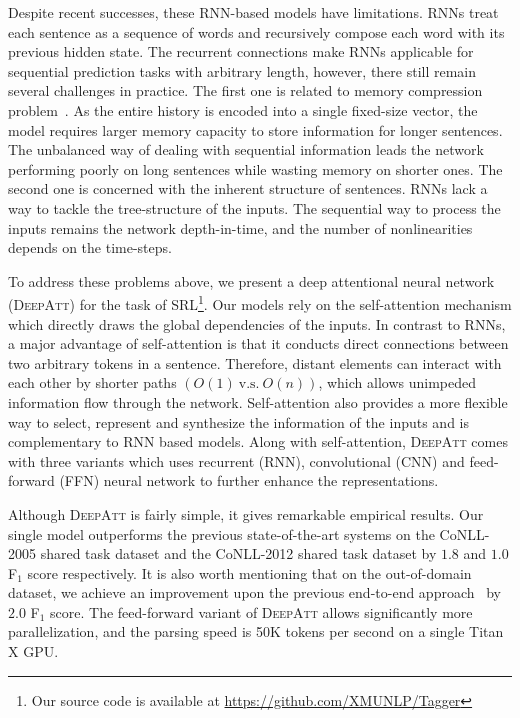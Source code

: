 \documentclass[letterpaper]{article} \usepackage{aaai18}  \usepackage{times}  \usepackage{helvet}  \usepackage{courier}  \usepackage{url}  \usepackage{graphicx}  \frenchspacing  \setlength{\pdfpagewidth}{8.5in}  \setlength{\pdfpageheight}{11in}  \usepackage{latexsym}
\begin{document}
Despite recent successes, these RNN-based models have limitations. RNNs treat each sentence as a sequence of words and recursively compose each word with its previous hidden state. The recurrent connections make RNNs applicable for sequential prediction tasks with arbitrary length, however, there still remain several challenges in practice. The first one is related to memory compression problem~\cite{cheng2016long}. As the entire history is encoded into a single fixed-size vector, the model requires larger memory capacity to store information for longer sentences. The unbalanced way of dealing with sequential information leads the network performing poorly on long sentences while wasting memory on shorter ones. The second one is concerned with the inherent structure of sentences. RNNs lack a way to tackle the tree-structure of the inputs. The sequential way to process the inputs remains the network depth-in-time, and the number of nonlinearities depends on the time-steps.

To address these problems above, we present a deep attentional neural network (\textsc{DeepAtt}) for the task of SRL\footnote{Our source code is available at \url{https://github.com/XMUNLP/Tagger}}. Our models rely on the self-attention mechanism which directly draws the global dependencies of the inputs. In contrast to RNNs, a major advantage of self-attention is that it conducts direct connections between two arbitrary tokens in a sentence. Therefore, distant elements can interact with each other by shorter paths $\left(O(1) \ \textrm{v.s.}\  O(n)\right)$, which allows unimpeded information flow through the network. Self-attention also provides a more flexible way to select, represent and synthesize the information of the inputs and is complementary to RNN based models. Along with self-attention, \textsc{DeepAtt} comes with three variants which uses recurrent (RNN), convolutional (CNN) and feed-forward (FFN) neural network to further enhance the representations.

Although \textsc{DeepAtt} is fairly simple, it gives remarkable empirical results. Our single model outperforms the previous state-of-the-art systems on the CoNLL-2005 shared task dataset and the CoNLL-2012 shared task dataset by $1.8$ and $1.0$ F$_1$ score respectively. It is also worth mentioning that on the out-of-domain dataset, we achieve an improvement upon the previous end-to-end approach~\cite{he2017deep} by $2.0$ F$_1$ score. The feed-forward variant of \textsc{DeepAtt} allows significantly more parallelization, and the parsing speed is 50K tokens per second on a single Titan X GPU.
\end{document}
